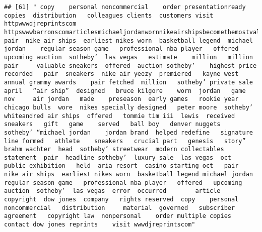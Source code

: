 \documentclass[
]{article}
\begin{document}
\begin{verbatim}
## [61] " copy    personal noncommercial    order presentationready copies  distribution   colleagues clients  customers visit httpwwwdjreprintscom httpswwwbarronscomarticlesmichaeljordanwornnikeairshipsbecomethemostvaluablesneakersofferedatauction  pair  nike air ships  earliest nikes worn  basketball legend  michael jordan    regular season game   professional nba player   offered   upcoming auction  sotheby’  las vegas   estimate    million   million  pair     valuable sneakers  offered  auction sotheby’    highest price  recorded   pair  sneakers  nike air yeezy  premiered   kayne west     annual grammy awards    pair fetched  million   sotheby’ private sale  april   “air ship”  designed   bruce kilgore    worn  jordan   game  nov     air jordan   made    preseason  early games   rookie year   chicago bulls  wore  nikes specially designed   peter moore  sotheby’   whiteandred air ships  offered   tommie tim iii  lewis  received  sneakers   gift   game    served   ball boy   denver nuggets   sotheby’ “michael jordan    jordan brand  helped redefine   signature line formed   athlete    sneakers   crucial part   genesis   story”  brahm wachter  head  sotheby’ streetwear  modern collectables    statement  pair  headline sotheby’  luxury sale  las vegas  oct   public exhibition   held  aria resort  casino starting oct   pair  nike air ships  earliest nikes worn  basketball legend michael jordan   regular season game   professional nba player   offered   upcoming auction  sotheby’  las vegas  error  occurred        article      copyright  dow jones  company   rights reserved  copy    personal noncommercial   distribution     material  governed   subscriber agreement   copyright law  nonpersonal    order multiple copies  contact dow jones reprints    visit wwwdjreprintscom"                                                                                                                                                                                                                                                                                                                                                                                                                                                                                                                                                                                                                                                                                                                                                                                                                                                                                                                                                                                                                                                                                                                                                                                                                                                                                                                                                                                                                                                                                                                                                                              
\end{verbatim}
\end{document}
